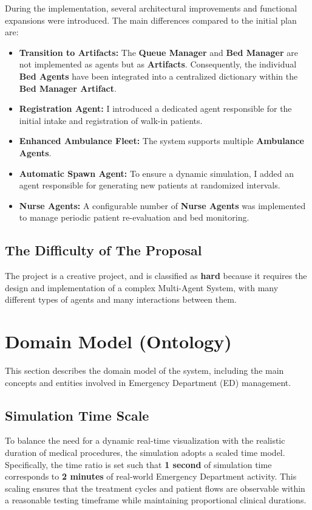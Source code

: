 \documentclass{article}[12pt]
\begin{document}
\vspace{\baselineskip}

\noindent
During the implementation, several architectural improvements and functional expansions were introduced. The main differences compared to the initial plan are:

\begin{itemize}
\item \textbf{Transition to Artifacts:} The \textbf{Queue Manager} and \textbf{Bed Manager} are not implemented as agents but as \textbf{Artifacts}. Consequently, the individual \textbf{Bed Agents} have been integrated into a centralized dictionary within the \textbf{Bed Manager Artifact}.
\item \textbf{Registration Agent:} I introduced a dedicated agent responsible for the initial intake and registration of walk-in patients.
\item \textbf{Enhanced Ambulance Fleet:} The system supports multiple \textbf{Ambulance Agents}.
\item \textbf{Automatic Spawn Agent:} To ensure a dynamic simulation, I added an agent responsible for generating new patients at randomized intervals.
\item \textbf{Nurse Agents:} A configurable number of \textbf{Nurse Agents} was implemented to manage periodic patient re-evaluation and bed monitoring.
\end{itemize}


\subsection{The Difficulty of The Proposal}
\label{subsec:points}

The project is a creative project, and is classified as \textbf{hard} because it requires the design and implementation of a complex Multi-Agent System, with many different types of agents and many interactions between them.
\pagebreak

\section{Domain Model (Ontology)}
\label{sec:domain-model}

This section describes the domain model of the system, including the main concepts and entities involved in Emergency Department (ED) management.

\subsection{Simulation Time Scale}
To balance the need for a dynamic real-time visualization with the realistic duration of medical procedures, the simulation adopts a scaled time model. Specifically, the time ratio is set such that \textbf{1 second} of simulation time corresponds to \textbf{2 minutes} of real-world Emergency Department activity. This scaling ensures that the treatment cycles and patient flows are observable within a reasonable testing timeframe while maintaining proportional clinical durations.
\end{document}
